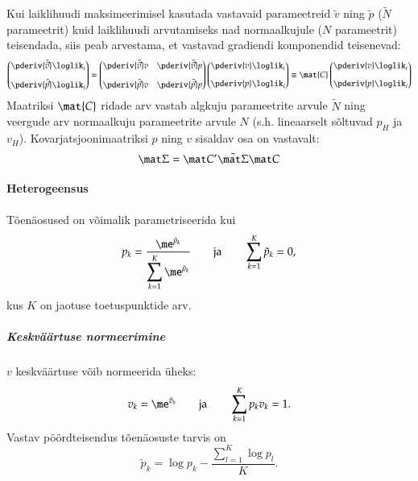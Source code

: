\documentclass[a4paper]{article}
\numberwithin{equation}{subsection}
\begin{document}
Kui laiklihuudi maksimeerimisel kasutada vastavaid parameetreid
$\tilde v$ ning $\tilde p$ ($\tilde N$ parameetrit) kuid laiklihuudi
arvutamiseks nad normaalkujule ($N$ parameetrit) teisendada, siis peab
arvestama, et vastavad gradiendi komponendid teisenevad:
\begin{equation}
  \begin{pmatrix}
    \displaystyle\pderiv{\tilde{\vec{v}}}\loglik_i\\[2ex]
    \displaystyle\pderiv{\tilde{\vec{p}}}\loglik_i
  \end{pmatrix}
  =
  \begin{pmatrix}
    \displaystyle\pderiv{\tilde{\vec{v}}}v &
    \displaystyle\pderiv{\tilde{\vec{v}}}p\\[2ex]
    \displaystyle\pderiv{\tilde{\vec{p}}}v &
    \displaystyle\pderiv{\tilde{\vec{p}}}p
  \end{pmatrix}
  \begin{pmatrix}
    \displaystyle\pderiv{v}\loglik_i\\[2ex]
    \displaystyle\pderiv{p}\loglik_i
  \end{pmatrix}
  \equiv
  \mat{C}
  \begin{pmatrix}
    \displaystyle\pderiv{v}\loglik_i\\[2ex]
    \displaystyle\pderiv{p}\loglik_i
  \end{pmatrix}
  \label{eq:kestus_parametriseerimine}
\end{equation}
Maatriksi $\mat{C}$ ridade arv vastab algkuju parameetrite arvule
$\tilde N$ ning veergude arv normaalkuju parameetrite arvule $N$ (s.h.
lineaarselt s\~{o}ltuvad $p_H$ ja $v_H$).  Kovarjatsjoonimaatriksi $p$
ning $v$ sisaldav osa on vastavalt:
\begin{equation}
  \mat\Sigma = \mat C' \tilde{\mat\Sigma} \mat C
\end{equation}


\paragraph{Heterogeensus} 
Tõenäosused on võimalik parametriseerida kui
\begin{equation}
  p_k = \frac{\displaystyle \me^{\tilde p_k}}
  {\displaystyle \sum_{k = 1}^{K} \me^{\tilde p_k}}
  \qquad\mbox{ja}\qquad 
  \sum_{k=1}^K \tilde p_k = 0,
\end{equation}
kus $K$ on jaotuse toetuspunktide arv.

\subparagraph{Keskväärtuse normeerimine} $v$ keskväärtuse võib
normeerida üheks:
\begin{equation}
  v_k = \me^{\tilde v_k}
  \qquad\mbox{ja}\qquad 
  \sum_{k=1}^K p_k v_k = 1.
\end{equation}
Vastav p\"{o}\"{o}rdteisendus t\~{o}en\"{a}osuste tarvis on
\begin{equation}
  \tilde p_k = \log p_k - 
  \frac{\sum_{l=1}^K \log p_l}{K}.
\end{equation}
\end{document}

